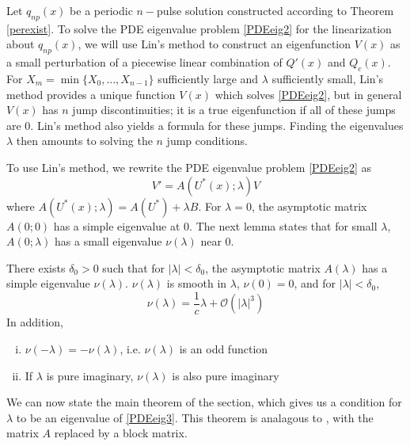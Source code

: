 \documentclass[thesis.tex]{subfiles}
\begin{document}
Let $q_{np}(x)$ be a periodic $n-$pulse solution constructed according to Theorem \ref{perexist}. To solve the PDE eigenvalue problem \eqref{PDEeig2} for the linearization about $q_{np}(x)$, we will use Lin's method to construct an eigenfunction $V(x)$ as a small perturbation of a piecewise linear combination of $Q'(x)$ and $Q_c(x)$. For $X_m = \min\{X_0, \dots, X_{n-1} \}$ sufficiently large and $\lambda$ sufficiently small, Lin's method provides a unique function $V(x)$ which solves \eqref{PDEeig2}, but in general $V(x)$ has $n$ jump discontinuities; it is a true eigenfunction if all of these jumps are 0. Lin's method also yields a formula for these jumps. Finding the eigenvalues $\lambda$ then amounts to solving the $n$ jump conditions.

To use Lin's method, we rewrite the PDE eigenvalue problem \eqref{PDEeig2} as
\begin{equation}\label{PDEeig3}
V' = A(U^*(x); \lambda)V 
\end{equation} 
where $A(U^*(x); \lambda) = A(U^*) + \lambda B$. For $\lambda = 0$, the asymptotic matrix $A(0; 0)$ has a simple eigenvalue at 0. The next lemma states that for small $\lambda$, $A(0; \lambda)$ has a small eigenvalue $\nu(\lambda)$ near 0.

\begin{lemma}\label{nulambdalemma}
There exists $\delta_0 > 0$ such that for $|\lambda| < \delta_0$, the asymptotic matrix $A(\lambda)$ has a simple eigenvalue $\nu(\lambda)$. $\nu(\lambda)$ is smooth in $\lambda$, $\nu(0) = 0$, and for $|\lambda| < \delta_0$,
\begin{equation}\label{nulambda}
\nu(\lambda) = \frac{1}{c} \lambda + \mathcal{O}(|\lambda|^3)
\end{equation}
In addition,
\begin{enumerate}[(i)]
\item $\nu(-\lambda) = -\nu(\lambda)$, i.e. $\nu(\lambda)$ is an odd function 
\item If $\lambda$ is pure imaginary, $\nu(\lambda)$ is also pure imaginary
\end{enumerate}
\end{lemma}

We can now state the main theorem of the section, which gives us a condition for $\lambda$ to be an eigenvalue of \eqref{PDEeig3}. This theorem is analagous to \cite[Theorem 2]{Sandstede1998}, with the matrix $A$ replaced by a block matrix.
\end{document}
